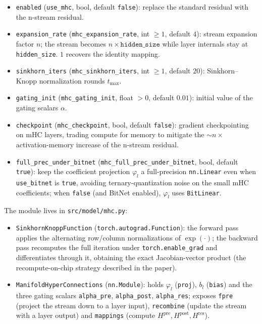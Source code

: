 \begin{itemize}[leftmargin=*]
    \item \texttt{enabled} (\texttt{use\_mhc}, bool, default \texttt{false}):
        replace the standard residual with the n-stream residual.
    \item \texttt{expansion\_rate} (\texttt{mhc\_expansion\_rate}, int $\ge 1$,
        default $4$): stream expansion factor $n$; the stream becomes
        $n \times \texttt{hidden\_size}$ while layer internals stay at
        \texttt{hidden\_size}. $1$ recovers the identity mapping.
    \item \texttt{sinkhorn\_iters} (\texttt{mhc\_sinkhorn\_iters}, int $\ge 1$,
        default $20$): Sinkhorn--Knopp normalization rounds $t_{\max}$.
    \item \texttt{gating\_init} (\texttt{mhc\_gating\_init}, float $> 0$,
        default $0.01$): initial value of the gating scalars $\alpha$.
    \item \texttt{checkpoint} (\texttt{mhc\_checkpoint}, bool, default
        \texttt{false}): gradient checkpointing on mHC layers, trading compute
        for memory to mitigate the $\sim n{\times}$ activation-memory increase
        of the n-stream residual.
    \item \texttt{full\_prec\_under\_bitnet}
        (\texttt{mhc\_full\_prec\_under\_bitnet}, bool, default
        \texttt{true}): keep the coefficient projection $\varphi_l$ a
        full-precision \texttt{nn.Linear} even when \texttt{use\_bitnet} is
        \texttt{true}, avoiding ternary-quantization noise on the small mHC
        coefficients; when \texttt{false} (and BitNet enabled), $\varphi_l$
        uses \texttt{BitLinear}.
\end{itemize}

The module lives in \texttt{src/model/mhc.py}:
\begin{itemize}[leftmargin=*]
    \item \texttt{Sinkhorn\-Knopp\-Function} (\texttt{torch.autograd.Function}):
        the forward pass applies the alternating row/column normalizations of
        $\exp(\cdot)$; the backward pass recomputes the full iteration under
        \texttt{torch.enable\_grad} and differentiates through it, obtaining
        the exact Jacobian-vector product (the recompute-on-chip strategy
        described in the paper).
    \item \texttt{ManifoldHyperConnections} (\texttt{nn.Module}): holds
        $\varphi_l$ (\texttt{proj}), $b_l$ (\texttt{bias}) and the three gating
        scalars \texttt{alpha\_pre}, \texttt{alpha\_post},
        \texttt{alpha\_res}; exposes \texttt{fpre} (project the stream down to
        a layer input), \texttt{recombine} (update the stream with a layer
        output) and \texttt{mappings} (compute $H^{\text{pre}}, H^{\text{post}},
        H^{\text{res}}$).
\end{itemize}

